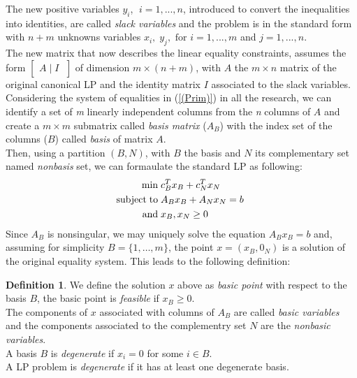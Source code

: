\documentclass[a4paper,10 pt,titlepage,twoside]{report}
\theoremstyle{plain}
\theoremstyle{definition}
\newtheorem{defn}[thm]{Definition}
\theoremstyle{remark}
\begin{document}
The new positive variables $\mathit{y_{i}}$, $\;i=1, ..., n$, introduced to convert the inequalities into identities, are called \textit{slack variables} and the problem is in the standard form with $n+m$ unknowns variables $x_{i},\; y_{j}, \text{ for }i =1, ..., m$ and $j=1, ..., n$.\\ The new matrix that now describes the linear equality constraints, assumes the form $\left[\begin{matrix}A\;\vert\; I\;\end{matrix}\right]$ of dimension $m \times (n + m)$, with $A$ the $m \times n$ matrix of the original canonical LP and the identity matrix $I$ associated to the slack variables.\\
Considering the system of equalities in (\ref{(Prim)}) in all the research, we can identify a set of \textit{m} linearly independent columns from the \textit{n} columns of  $A$ and create a $m \times m$ submatrix called \textit{basis matrix} ($A_{B}$) with the index set of the columns ($B$) called \textit{basis} of matrix $A$.
\\ Then, using a partition $(B, N)$, with $B$ the basis and $N$ its complementary set named \textit{nonbasis} set, we can formaulate the standard LP as following:
\begin{equation}\label{(Prim1)}
\begin{split}
\min\;&c_{B}^{T}x_{B}+c_{N}^{T}x_{N}\\
\text{subject\;to\;}&A_{B}x_{B}+A_{N}x_{N}= b\;\\\text{and\;}&x_{B},x_{N}\geq0
\end{split}
\end{equation}
Since $A_{B}$ is nonsingular, we may uniquely solve the equation $A_{B}x_{B} = b$ and, assuming for simplicity $B = \{1, \dots, m\}$, the point $x =\left(x_{B},0_{N}\right)$ is a solution of the original equality system. This leads to the following definition:
\begin{defn}

	We define the solution $x$ above as \textit{basic point} with respect to the basis $B$, the basic point is \textit{feasible} if $x_{B}\geq 0$. \\The components of $x$ associated with columns of $A_{B}$ are called \textit{basic variables} and the components associated to the complementry set $N$ are the \textit{nonbasic variables}.\\
	A basis $B$ is \textit{degenerate} if $x_{i}= 0$ for some $i\in B$.\\
	A LP problem is \textit{degenerate} if it has at least one degenerate basis.
\end{defn}
\end{document}
